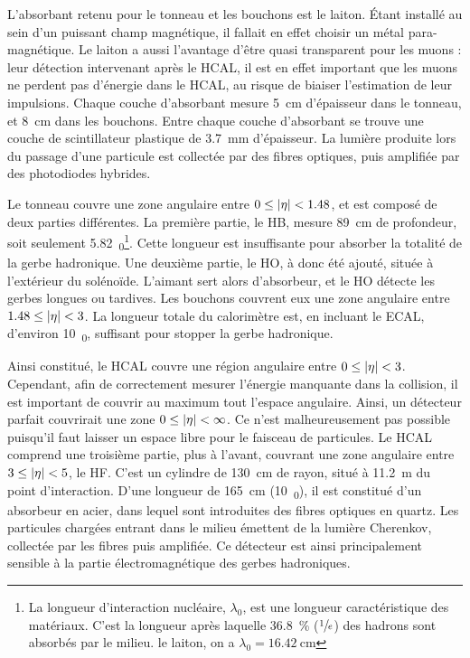 L'absorbant retenu pour le tonneau et les bouchons est le laiton. Étant installé au sein d'un puissant champ magnétique, il fallait en effet choisir un métal para-magnétique. Le laiton a aussi l'avantage d'être quasi transparent pour les muons : leur détection intervenant après le HCAL, il est en effet important que les muons ne perdent pas d'énergie dans le HCAL, au risque de biaiser l'estimation de leur impulsions. Chaque couche d'absorbant mesure \SI{5}{\cm} d'épaisseur dans le tonneau, et \SI{8}{\cm} dans les bouchons. Entre chaque couche d'absorbant se trouve une couche de scintillateur plastique de \SI{3.7}{\mm} d'épaisseur. La lumière produite lors du passage d'une particule est collectée par des fibres optiques, puis amplifiée par des photodiodes hybrides.

\medskip

Le tonneau couvre une zone angulaire entre $0 \leq \lvert \eta \rvert < \num{1.48}$, et est composé de deux parties différentes. La première partie, le HB, mesure \SI{89}{\cm} de profondeur, soit seulement \SI{5.82}{\lambda_0}\footnote{La longueur d'interaction nucléaire, $\lambda_0$, est une longueur caractéristique des matériaux. C'est la longueur après laquelle \SI{36.8}{\%} ($\sfrac{1}{e}$) des hadrons sont absorbés par le milieu. le laiton, on a $\lambda_0 = \SI{16.42}{\cm}$}. Cette longueur est insuffisante pour absorber la totalité de la gerbe hadronique. Une deuxième partie, le HO, à donc été ajouté, située à l'extérieur du solénoïde. L'aimant sert alors d'absorbeur, et le HO détecte les gerbes longues ou tardives. Les bouchons couvrent eux une zone angulaire entre $1.48 \leq \lvert \eta \rvert < \num{3}$. La longueur totale du calorimètre est, en incluant le ECAL, d'environ \SI{10}{\lambda_0}, suffisant pour stopper la gerbe hadronique.

\bigskip

Ainsi constitué, le HCAL couvre une région angulaire entre $0 \leq \lvert \eta \rvert < \num{3}$. Cependant, afin de correctement mesurer l'énergie manquante dans la collision, il est important de couvrir au maximum tout l'espace angulaire. Ainsi, un détecteur parfait couvrirait une zone $0 \leq \lvert \eta \rvert < \infty$. Ce n'est malheureusement pas possible puisqu'il faut laisser un espace libre pour le faisceau de particules. Le HCAL comprend une troisième partie, plus à l'avant, couvrant une zone angulaire entre $\num{3} \leq \lvert \eta \rvert < \num{5}$, le HF. C'est un cylindre de \SI{130}{\cm} de rayon, situé à \SI{11.2}{\m} du point d'interaction. D'une longueur de \SI{165}{\cm} (\tilde \SI{10}{\lambda_0}), il est constitué d'un absorbeur en acier, dans lequel sont introduites des fibres optiques en quartz. Les particules chargées entrant dans le milieu émettent de la lumière Cherenkov, collectée par les fibres puis amplifiée. Ce détecteur est ainsi principalement sensible à la partie électromagnétique des gerbes hadroniques.

